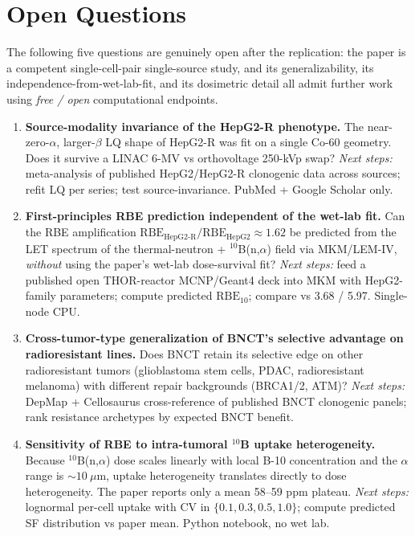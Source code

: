\section{Open Questions}

The following five questions are genuinely open after the replication:
the paper is a competent single-cell-pair single-source study, and its
generalizability, its independence-from-wet-lab-fit, and its dosimetric
detail all admit further work using \emph{free / open} computational
endpoints.

\begin{enumerate}
  \item \textbf{Source-modality invariance of the HepG2-R phenotype.}
        The near-zero-$\alpha$, larger-$\beta$ LQ shape of HepG2-R was fit
        on a single Co-60 geometry. Does it survive a LINAC 6-MV vs
        orthovoltage 250-kVp swap?
        \emph{Next steps:} meta-analysis of published HepG2/HepG2-R
        clonogenic data across sources; refit LQ per series; test
        source-invariance. PubMed + Google Scholar only.

  \item \textbf{First-principles RBE prediction independent of the wet-lab fit.}
        Can the RBE amplification $\mathrm{RBE}_{\mathrm{HepG2\text{-}R}}
        / \mathrm{RBE}_{\mathrm{HepG2}} \approx 1.62$ be predicted from the
        LET spectrum of the thermal-neutron + $^{10}$B(n,$\alpha$) field
        via MKM/LEM-IV, \emph{without} using the paper's wet-lab
        dose-survival fit?
        \emph{Next steps:} feed a published open THOR-reactor MCNP/Geant4
        deck into MKM with HepG2-family parameters; compute predicted
        $\mathrm{RBE}_{10}$; compare vs 3.68 / 5.97. Single-node CPU.

  \item \textbf{Cross-tumor-type generalization of BNCT's selective
        advantage on radioresistant lines.}
        Does BNCT retain its selective edge on other radioresistant
        tumors (glioblastoma stem cells, PDAC, radioresistant melanoma)
        with different repair backgrounds (BRCA1/2, ATM)?
        \emph{Next steps:} DepMap + Cellosaurus cross-reference of
        published BNCT clonogenic panels; rank resistance archetypes
        by expected BNCT benefit.

  \item \textbf{Sensitivity of RBE to intra-tumoral $^{10}$B uptake
        heterogeneity.}
        Because $^{10}$B(n,$\alpha$) dose scales linearly with local B-10
        concentration and the $\alpha$ range is $\sim 10~\mu$m, uptake
        heterogeneity translates directly to dose heterogeneity. The paper
        reports only a mean 58--59 ppm plateau.
        \emph{Next steps:} lognormal per-cell uptake with CV in
        $\{0.1, 0.3, 0.5, 1.0\}$; compute predicted SF distribution
        vs paper mean. Python notebook, no wet lab.


\end{enumerate}
